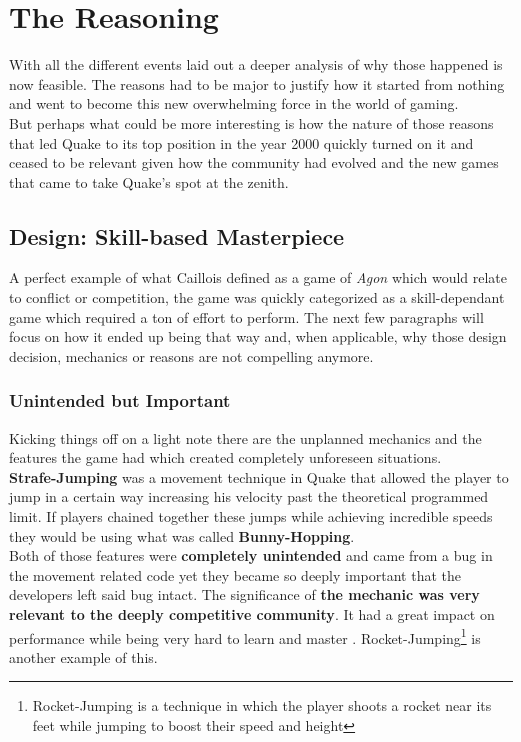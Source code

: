 \section{The Reasoning}
\label{sec::reasoning}

With all the different events laid out a deeper analysis of why those happened is now feasible. The reasons had to be major to justify how it started from nothing and went to become this new overwhelming force in the world of gaming.\\

But perhaps what could be more interesting is how the nature of those reasons that led Quake to its top position in the year 2000 quickly turned on it and ceased to be relevant given how the community had evolved and the new games that came to take Quake's spot at the zenith.\\

\subsection{Design: Skill-based Masterpiece}

A perfect example of what Caillois defined as a game of \textit{Agon} \citep{caillois1961man} which would relate to conflict or competition, the game was quickly categorized as a skill-dependant game which required a ton of effort to perform. The next few paragraphs will focus on how it ended up being that way and, when applicable, why those design decision, mechanics or reasons are not compelling anymore.

\subsubsection{Unintended but Important}

Kicking things off on a light note there are the unplanned mechanics and the features the game had which created completely unforeseen situations.\\

\textbf{Strafe-Jumping} was a movement technique in Quake that allowed the player to jump in a certain way increasing his velocity past the theoretical programmed limit. If players chained together these jumps while achieving incredible speeds they would be using what was called \textbf{Bunny-Hopping}.\\

Both of those features were \textbf{completely unintended} and came from a bug in the movement related code yet they became so deeply important that the developers left said bug intact. The significance of \textbf{the mechanic was very relevant to the deeply competitive community}. It had a great impact on performance while being very hard to learn and master \parencite{speedRun}. Rocket-Jumping\footnote{Rocket-Jumping is a technique in which the player shoots a rocket near its feet while jumping to boost their speed and height} is another example of this.\\

